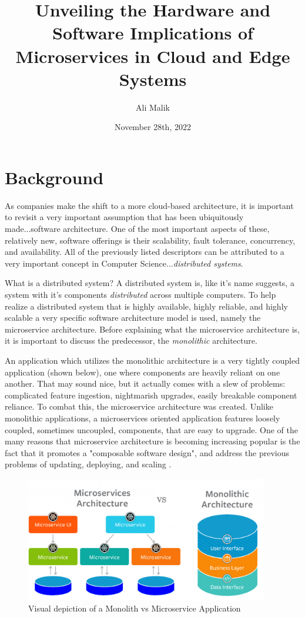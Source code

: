 \documentclass[12pt]{report}
\title{Unveiling the Hardware and Software Implications of Microservices in Cloud and Edge Systems}
\author{Ali Malik}
\date{November 28th, 2022}
\begin{document}
\maketitle

\section*{Background}
As companies make the shift to a more cloud-based architecture, it is important to revisit a very important assumption that has been ubiquitously made...software architecture. One of the most important aspects of these, relatively new, software offerings is their scalability, fault tolerance, concurrency, and availability. All of the previously listed descriptors can be attributed to a very important concept in Computer Science...\textit{distributed systems}. 

What is a distributed system? A distributed system is, like it's name suggests, a system with it's components \textit{distributed} across multiple computers. To help realize a distributed system that is highly available, highly reliable, and highly scalable a very specific software architecture model is used, namely the microservice architecture. Before explaining what the microservice architecture is, it is important to discuss the predecessor, the \textit{monolithic} architecture.

An application which utilizes the monolithic architecture is a very tightly coupled application (shown below), one where components are heavily reliant on one another. That may sound nice, but it actually comes with a slew of problems: complicated feature ingestion, nightmarish upgrades, easily breakable component reliance. To combat this, the microservice architecture was created. Unlike monolithic applications, a microservices oriented application features loosely coupled, sometimes uncoupled, components, that are easy to upgrade. One of the many reasons that microservice architecture is becoming increasing popular is the fact that it promotes a "composable software design", and address the previous problems of updating, deploying, and scaling \cite{article}. 

\begin{figure}[H]
    \centering
    \includegraphics[width=300pt]{images/microVmono.png}
    \caption{Visual depiction of a Monolith vs Microservice Application}
    \label{fig:monoVmicro}
\end{figure}
\end{document}
